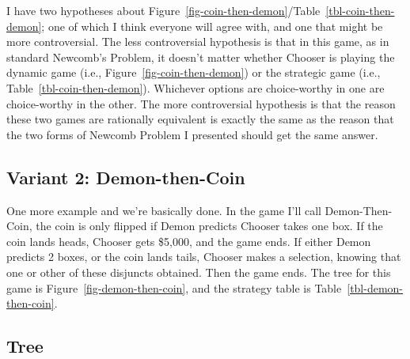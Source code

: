 \documentclass[
  10pt,
  letterpaper,
  DIV=11,
  numbers=noendperiod,
  twoside]{scrartcl}
\begin{document}
I have two hypotheses about
Figure~\ref{fig-coin-then-demon}/Table~\ref{tbl-coin-then-demon}; one of
which I think everyone will agree with, and one that might be more
controversial. The less controversial hypothesis is that in this game,
as in standard Newcomb's Problem, it doesn't matter whether Chooser is
playing the dynamic game (i.e., Figure~\ref{fig-coin-then-demon}) or the
strategic game (i.e., Table~\ref{tbl-coin-then-demon}). Whichever
options are choice-worthy in one are choice-worthy in the other. The
more controversial hypothesis is that the reason these two games are
rationally equivalent is exactly the same as the reason that the two
forms of Newcomb Problem I presented should get the same answer.

\subsection{Variant 2: Demon-then-Coin}\label{variant-2-demon-then-coin}

One more example and we're basically done. In the game I'll call
Demon-Then-Coin, the coin is only flipped if Demon predicts Chooser
takes one box. If the coin lands heads, Chooser gets \$5,000, and the
game ends. If either Demon predicts 2 boxes, or the coin lands tails,
Chooser makes a selection, knowing that one or other of these disjuncts
obtained. Then the game ends. The tree for this game is
Figure~\ref{fig-demon-then-coin}, and the strategy table is
Table~\ref{tbl-demon-then-coin}.

\subsection{Tree}
\end{document}
